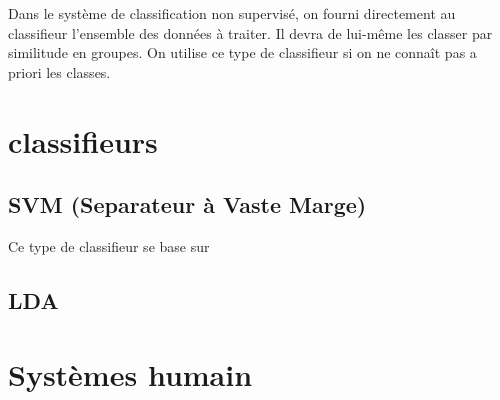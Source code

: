 Dans le système de classification non supervisé, on fourni directement au classifieur l'ensemble des données à traiter. Il devra de lui-même les classer par similitude en groupes. On utilise ce type de classifieur si on ne connaît pas a priori les classes.

	\section{classifieurs}

		
		\subsection{SVM (Separateur à Vaste Marge)}

Ce type de classifieur se base sur 
		\subsection{LDA}

	\section{Systèmes humain}
